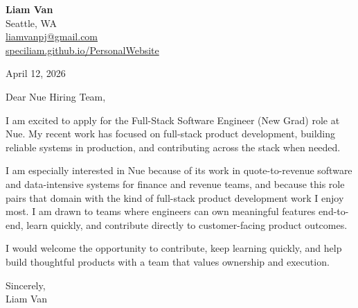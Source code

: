 \documentclass[letterpaper,11pt]{article}
\begin{document}
\begin{flushleft}
\textbf{\Large Liam Van} \\
Seattle, WA \\
\href{mailto:liamvanpj@gmail.com}{liamvanpj@gmail.com} \\
\href{https://speciliam.github.io/PersonalWebsite}{speciliam.github.io/PersonalWebsite}
\end{flushleft}

April 12, 2026

\noindent Dear Nue Hiring Team,

\noindent I am excited to apply for the Full-Stack Software Engineer (New Grad) role at Nue. My recent work has focused on full-stack product development, building reliable systems in production, and contributing across the stack when needed.

\noindent I am especially interested in Nue because of its work in quote-to-revenue software and data-intensive systems for finance and revenue teams, and because this role pairs that domain with the kind of full-stack product development work I enjoy most. I am drawn to teams where engineers can own meaningful features end-to-end, learn quickly, and contribute directly to customer-facing product outcomes.

\noindent I would welcome the opportunity to contribute, keep learning quickly, and help build thoughtful products with a team that values ownership and execution.

\noindent Sincerely, \\
Liam Van
\end{document}
